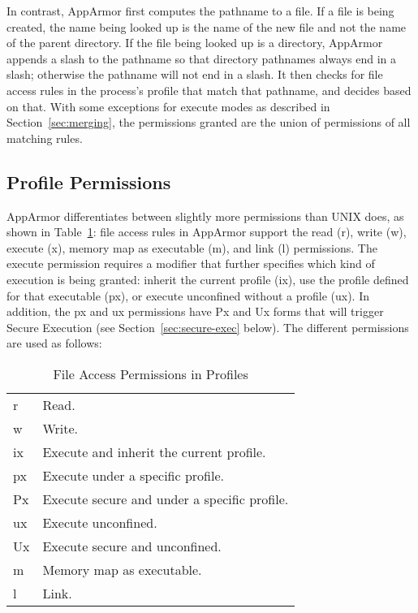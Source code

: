 \documentclass[a4paper]{article}
\begin{document}
In contrast, AppArmor first computes the pathname to a file.  If a file
is being created, the name being looked up is the name of the new file
and not the name of the parent directory.  If the file being looked up
is a directory, AppArmor appends a slash to the pathname so that
directory pathnames always end in a slash; otherwise the pathname will
not end in a slash. It then checks for file access rules in the
process's profile that match that pathname, and decides based on that.
With some exceptions for execute modes as described in
Section~\ref{sec:merging}, the permissions granted are the union of
permissions of all matching rules.


\subsection{Profile Permissions}
\label{sec:permissions}

AppArmor differentiates between slightly more permissions than UNIX
does, as shown in Table~\ref{tab:permissions}: file access rules in
AppArmor support the read (r), write (w), execute (x), memory map as
executable (m), and link (l) permissions.  The execute permission
requires a modifier that further specifies which kind of execution is
being granted: inherit the current profile (ix), use the profile defined
for that executable (px), or execute unconfined without a profile (ux).
In addition, the px and ux permissions have Px and Ux forms that will
trigger Secure Execution (see Section~\ref{sec:secure-exec} below).
The different permissions are used as follows:

\begin{table}[tb]
\center
\begin{tabular}{|l|l|}
\hline
r	& Read.							\\
w	& Write.						\\
ix	& Execute and inherit the current profile.		\\
px	& Execute under a specific profile.			\\
Px	& Execute secure and under a specific profile.		\\
ux	& Execute unconfined.					\\
Ux	& Execute secure and unconfined.			\\
m	& Memory map as executable.				\\
l	& Link.							\\
\hline
\end{tabular}
\caption{File Access Permissions in Profiles}
\label{tab:permissions}
\end{table}
\end{document}
